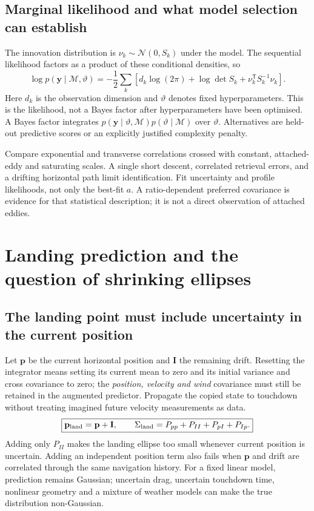 \subsection{Marginal likelihood and what model selection can establish}
The innovation distribution is $\nu_k\sim\mathcal N(0,S_k)$ under the model. The sequential likelihood factors as a product of these conditional densities, so
\begin{equation}
 \log p(\mathbf y\mid\mathcal M,\vartheta)
 =-\frac12\sum_k\left[d_k\log(2\pi)+\log\det S_k+\nu_k^{\mathsf T}S_k^{-1}\nu_k\right].
\end{equation}
Here $d_k$ is the observation dimension and $\vartheta$ denotes fixed hyperparameters. This is the likelihood, not a Bayes factor after hyperparameters have been optimised. A Bayes factor integrates $p(\mathbf y\mid\vartheta,\mathcal M)p(\vartheta\mid\mathcal M)$ over $\vartheta$. Alternatives are held-out predictive scores or an explicitly justified complexity penalty.

Compare exponential and transverse correlations crossed with constant, attached-eddy and saturating scales. A single short descent, correlated retrieval errors, and a drifting horizontal path limit identification. Fit uncertainty and profile likelihoods, not only the best-fit $a$. A ratio-dependent preferred covariance is evidence for that statistical description; it is not a direct observation of attached eddies.

\section{Landing prediction and the question of shrinking ellipses}
\label{sec:landing}

\subsection{The landing point must include uncertainty in the current position}
Let $\mathbf p$ be the current horizontal position and $\mathbf I$ the remaining drift. Resetting the integrator means setting its current mean to zero and its initial variance and cross covariance to zero; the \emph{position, velocity and wind} covariance must still be retained in the augmented predictor. Propagate the copied state to touchdown without treating imagined future velocity measurements as data.
\begin{equation}
 \boxed{\mathbf p_{\rm land}=\mathbf p+\mathbf I,\qquad
 \Sigma_{\rm land}=P_{pp}+P_{II}+P_{pI}+P_{Ip}.}
\end{equation}
Adding only $P_{II}$ makes the landing ellipse too small whenever current position is uncertain. Adding an independent position term also fails when $\mathbf p$ and drift are correlated through the same navigation history. For a fixed linear model, prediction remains Gaussian; uncertain drag, uncertain touchdown time, nonlinear geometry and a mixture of weather models can make the true distribution non-Gaussian.

